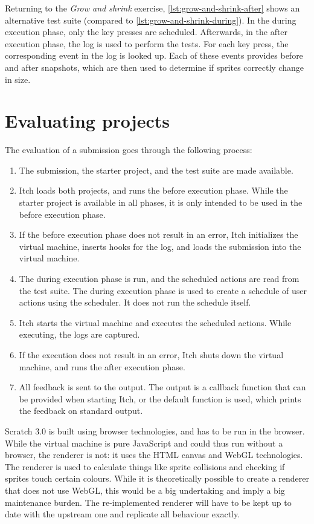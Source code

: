 \documentclass[../main]{subfiles}
\begin{document}
Returning to the \emph{Grow and shrink} exercise, \cref{lst:grow-and-shrink-after} shows an alternative test suite (compared to \cref{lst:grow-and-shrink-during}).
In the during execution phase, only the key presses are scheduled.
Afterwards, in the after execution phase, the log is used to perform the tests.
For each key press, the corresponding event in the log is looked up.
Each of these events provides before and after snapshots, which are then used to determine if sprites correctly change in size.

\section{Evaluating projects}\label{sec:itch-evaluating-projects}

The evaluation of a submission goes through the following process:

\begin{enumerate}
    \item The submission, the starter project, and the test suite are made available.
    \item Itch loads both projects, and runs the before execution phase.
        While the starter project is available in all phases, it is only intended to be used in the before execution phase.
    \item If the before execution phase does not result in an error, Itch initializes the virtual machine, inserts hooks for the log, and loads the submission into the virtual machine.
    \item The during execution phase is run, and the scheduled actions are read from the test suite.
        The during execution phase is used to create a schedule of user actions using the scheduler.
        It does not run the schedule itself.
    \item Itch starts the virtual machine and executes the scheduled actions.
          While executing, the logs are captured.
    \item If the execution does not result in an error, Itch shuts down the virtual machine, and runs the after execution phase.
    \item All feedback is sent to the output.
        The output is a callback function that can be provided when starting Itch, or the default function is used, which prints the feedback on standard output.
\end{enumerate}

Scratch 3.0 is built using browser technologies, and has to be run in the browser.
While the virtual machine is pure JavaScript and could thus run without a browser, the renderer is not: it uses the HTML canvas and WebGL technologies.
The renderer is used to calculate things like sprite collisions and checking if sprites touch certain colours.
While it is theoretically possible to create a renderer that does not use WebGL, this would be a big undertaking and imply a big maintenance burden.
The re-implemented renderer will have to be kept up to date with the upstream one and replicate all behaviour exactly.
\end{document}
